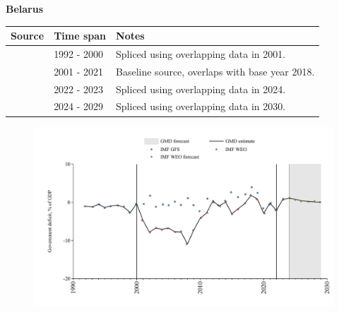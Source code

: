 \documentclass[12pt,a4paper,landscape]{article}
\begin{document}
\begin{adjustbox}{max totalsize={\paperwidth}{\paperheight},center}
\begin{minipage}[t][\textheight][t]{\textwidth}
\vspace*{0.5cm}
{}
\begin{center}
{\Large\bfseries Belarus}
\end{center}
\vspace{0.5cm}
\begin{table}[H]
\centering
\small
\begin{tabular}{|l|l|l|}
\hline
\textbf{Source} & \textbf{Time span} & \textbf{Notes} \\
\hline
\rowcolor{white}\cite{IMF_GFS}& 1992 - 2000 &Spliced using overlapping data in 2001.\\
\rowcolor{lightgray}\cite{IMF_WEO}& 2001 - 2021 &Baseline source, overlaps with base year 2018.\\
\rowcolor{white}\cite{IMF_GFS}& 2022 - 2023 &Spliced using overlapping data in 2024.\\
\rowcolor{lightgray}\cite{IMF_WEO_forecast}& 2024 - 2029 &Spliced using overlapping data in 2030.\\
\hline
\end{tabular}
\end{table}
\begin{figure}[H]
\centering
\includegraphics[width=\textwidth,height=0.6\textheight,keepaspectratio]{graphs/BLR_govdef_GDP.pdf}
\end{figure}
\end{minipage}
\end{adjustbox}
\end{document}
